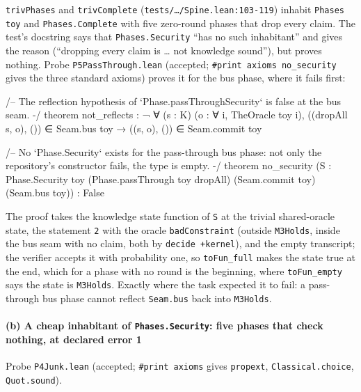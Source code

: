 \texttt{trivPhases} and \texttt{trivComplete} (\texttt{tests/\allowbreak{}…/\allowbreak{}Spine.\allowbreak{}lean:103-{}119}) inhabit \texttt{Phases toy} and \texttt{Phases.\allowbreak{}Complete} with five zero-round phases that drop every claim. The test's docstring says that \texttt{Phases.\allowbreak{}Security} \enquote{has no such inhabitant} and gives the reason (\enquote{dropping every claim is … not knowledge sound}), but proves nothing. Probe \texttt{P5PassThrough.\allowbreak{}lean} (accepted; \texttt{\#print axioms no\_\allowbreak{}security} gives the three standard axioms) proves it for the bus phase, where it fails first:

\begin{leancode}
/-- The reflection hypothesis of `Phase.passThroughSecurity` is false at the bus seam. -/
theorem not_reflects : ¬ ∀ (s : K) (o : ∀ i, TheOracle toy i),
    ((dropAll s, o), ()) ∈ Seam.bus toy → ((s, o), ()) ∈ Seam.commit toy

/-- No `Phase.Security` exists for the pass-through bus phase: not only the repository's
constructor fails, the type is empty. -/
theorem no_security (S : Phase.Security toy (Phase.passThrough toy dropAll) (Seam.commit toy)
    (Seam.bus toy)) : False
\end{leancode}

The proof takes the knowledge state function of \texttt{S} at the trivial shared-oracle state, the statement \texttt{2} with the oracle \texttt{badConstraint} (outside \texttt{M3Holds}, inside the bus seam with no claim, both by \texttt{decide +kernel}), and the empty transcript; the verifier accepts it with probability one, so \texttt{toFun\_\allowbreak{}full} makes the state true at the end, which for a phase with no round is the beginning, where \texttt{toFun\_\allowbreak{}empty} says the state is \texttt{M3Holds}. Exactly where the task expected it to fail: a pass-through bus phase cannot reflect \texttt{Seam.\allowbreak{}bus} back into \texttt{M3Holds}.

\paragraph{(b) A cheap inhabitant of \texttt{Phases.\allowbreak{}Security}: five phases that check nothing, at declared error 1}

Probe \texttt{P4Junk.\allowbreak{}lean} (accepted; \texttt{\#print axioms} gives \texttt{propext}, \texttt{Classical.\allowbreak{}choice}, \texttt{Quot.\allowbreak{}sound}).


